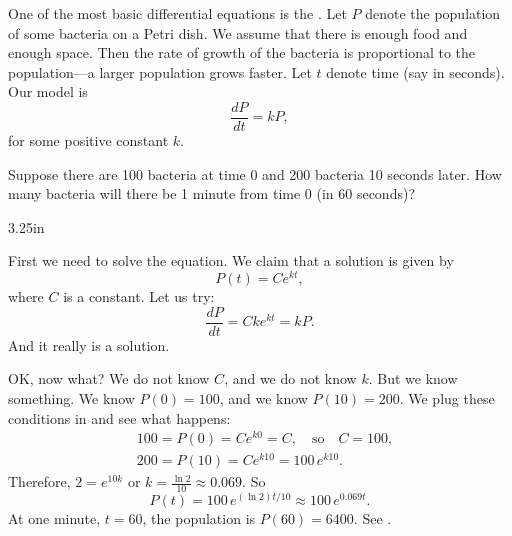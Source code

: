 \begin{example}
One of the most basic differential equations
is the \emph{}.
Let $P$ denote the population
of some bacteria on a Petri dish.  We assume that there is enough food
and enough space.  Then the rate of growth of the bacteria is proportional
to the population---a larger population grows faster.  Let $t$ denote
time (say in seconds).  Our model
is
\begin{equation*}
\frac{dP}{dt} = kP ,
\end{equation*}
for some positive constant $k$.

Suppose there are 100 bacteria at time 0 and 200 bacteria 10 seconds later.
How many bacteria will there be 1 minute from time 0 (in 60 seconds)?

\begin{mywrapfig}{3.25in}
\capstart
{}
\caption{Bacteria growth in the first 60 seconds.\label{intro:plotbactfig}}
\end{mywrapfig}
%
%
First we need to solve the equation.  We claim that a solution is given by
\begin{equation*}
P(t) = C e^{kt} ,
\end{equation*}
where $C$ is a constant.  Let us try:
\begin{equation*}
\frac{dP}{dt} = C k e^{kt} = k P .
\end{equation*}
And it really is a solution.

OK\@, now what?  We do not know $C$, and we do not know $k$.  But we know
something.  We know $P(0) = 100$, and we know
$P(10) = 200$.  We plug these conditions in and see what happens:
\begin{align*}
& 100 = P(0) = C e^{k0} = C, \quad \text{so} \quad C=100,\\
& 200 = P(10) = C e^{k10} = 100 \, e^{k10} .
\end{align*}
Therefore, $2 = e^{10k}$ or $k = \frac{\ln 2}{10} \approx 0.069$.
So
\begin{equation*}
P(t) = 100 \, e^{(\ln 2) t / 10} \approx 100 \, e^{0.069 t} .
\end{equation*}
At one minute, $t=60$, the population is $P(60) = 6400$.  See
.



\end{example}
